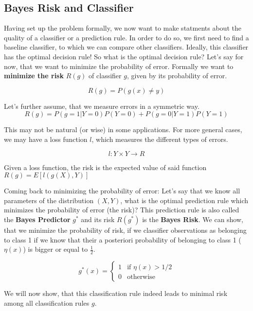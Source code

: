 \documentclass[12pt, authoryear]{elsarticle}
\begin{document}
\subsection{Bayes Risk and Classifier}

Having set up the problem formally, we now want to make statments about the quality of a classifier or a prediction rule. In order to do so, we first need to find a baseline classifier, to which we can compare other classifiers. Ideally, this classifier has the optimal decision rule! So what is the optimal decision rule? Let's say for now, that we want to minimize the probability of error. Formally we want to  \textbf{minimize the risk} $R(g)$ of classifier $g$, given by its probability of error.

$$R(g) = P(g(x) \neq y)$$

Let's further assume, that we measure errors in a symmetric way. \\
$$R(g) = P(g =1 |Y= 0) P(Y=0) + P(g =0 | Y= 1) P(Y=1) $$  

This may not be natural (or wise) in some applications. For more general cases, we may have a loss function $l$, which measures the different types of errors. 

$$ l: Y \times Y \rightarrow R$$ 

Given a loss function, the risk is the expected value of said function $R(g) = E[l(g(X),Y)]$

Coming back to minimizing the probability of error: Let's say that we know all parameters of the distribution $(X,Y)$, what is the optimal prediction rule which minimizes the probability of error (the risk)? This prediction rule is also called the \textbf{Bayes Predictor} $g^*$ and its risk $R(g^*)$ is the \textbf{Bayes Risk}. We can show, that we minimize the probability of risk, if we classifier observations as belonging to class 1 if we know that their a posteriori probability of belonging to class 1 ($\eta(x)$) is bigger or equal to $\frac{1}{2}$.

\begin{equation*}
g^*(x) = \begin{cases}
1 &\text{if $\eta(x) > 1/2$}\\
0 &\text{otherwise}
\end{cases}
\end{equation*}

We will now show, that this classification rule indeed leads to minimal risk among all classification rules $g$. \\
\end{document}
